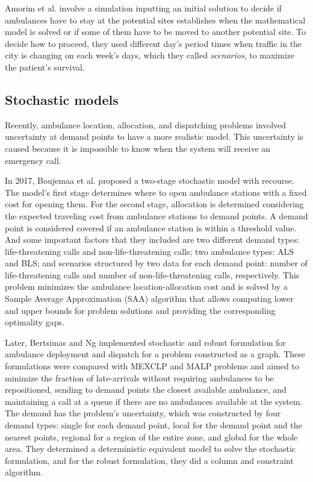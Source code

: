 Amorim et al. \cite{amorim2019traffic} involve a simulation inputting an initial solution to decide if ambulances have to stay at the potential sites establishes when the mathematical model is solved or if some of them have to be moved to another potential site. To decide how to proceed, they used different day's period times when traffic in the city is changing on each week's days, which they called \textit{scenarios}, to maximize the patient's survival. 

\subsection{Stochastic models}

Recently, ambulance location, allocation, and dispatching problems involved un\-cer\-tain\-ty at demand points to have a more realistic model. This uncertainty is caused because it is impossible to know when the system will receive an emergency call.

In 2017, Boujemaa et al. \cite{boujemaa2018stochastic} proposed a two-stage stochastic model with recourse. The model's first stage determines where to open ambulance stations with a fixed cost for opening them. For the second stage, allocation is determined considering the expected traveling cost from ambulance stations to demand points. A demand point is considered covered if an ambulance station is within a threshold value. And some important factors that they included are two different demand types: life-threatening calls and non-life-threatening calls; two ambulance types: ALS and BLS; and scenarios structured by two data for each demand point: number of life-threatening calls and number of non-life-threatening calls, respectively. This problem minimizes the ambulance location-allocation cost and is solved by a Sample Average Approximation (SAA) algorithm that allows computing lower and upper bounds for problem solutions and providing the corresponding optimality gaps.

Later, Bertsimas and Ng \cite{bertsimas2019robust} implemented stochastic and robust formulation for ambulance deployment and dispatch for a problem constructed as a graph. These formulations were compared with MEXCLP and MALP problems and aimed to minimize the fraction of late-arrivals without requiring ambulances to be repositioned, sending to demand points the closest available ambulance, and maintaining a call at a queue if there are no ambulances available at the system. The demand has the problem's uncertainty, which was constructed by four demand types: single for each demand point, local for the demand point and the nearest points, regional for a region of the entire zone, and global for the whole area. They determined a deterministic equivalent model to solve the stochastic formulation, and for the robust formulation, they did a column and constraint algorithm.  

